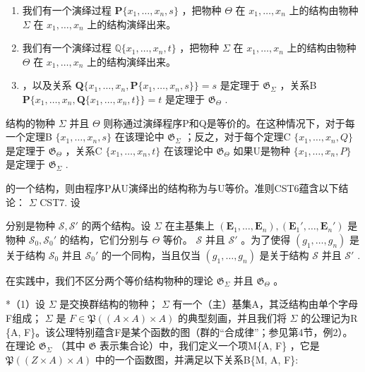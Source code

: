 \begin{enumerate}
\def\labelenumi{(\arabic{enumi})}
\item
  我们有一个演绎过程 \(\mathbf{P}\{x_1, \ldots, x_n, s\}\) ，把物种 \(\Theta\) 在 \(x_1, \ldots, x_n\) 上的结构由物种 \(\Sigma\) 在 \(x_1, \ldots, x_n\) 上的结构演绎出来。
\item
  我们有一个演绎过程 \(\mathbb{Q}\{x_1, \ldots, x_n, t\}\) ，把物种 \(\Sigma\) 在 \(x_1, \ldots, x_n\) 上的结构由物种 \(\Theta\) 在 \(x_1, \ldots, x_n\) 上的结构演绎出来。
\item
  ，以及关系 \(\mathbf{Q}\{x_1, \ldots, x_n, \mathbf{P}\{x_1, \ldots, x_n, s\}\} = s\) 是定理于 \(\mathfrak{G}_{\Sigma}\) ，关系B \(\mathbf{P}\{x_1, \ldots, x_n, \mathbf{Q}\{x_1, \ldots, x_n, t\}\} = t\) 是定理于 \(\mathfrak{G}_{\Theta}\) .
\end{enumerate}

结构的物种 \(\Sigma\) 并且 \(\Theta\) 则称通过演绎程序P和Q是等价的。在这种情况下，对于每一个定理B \(\{x_1, \ldots, x_n, s\}\) 在该理论中 \(\mathfrak{G}_{\Sigma}\) ；反之，对于每个定理C \(\{x_1, \ldots, x_n, Q\}\) 是定理于 \(\mathfrak{G}_{\Theta}\) ，关系C \(\{x_1, \ldots, x_n, t\}\) 在该理论中 \(\mathfrak{G}_{\Theta}\) 如果U是物种 \(\{x_1, \ldots, x_n, P\}\) 是定理于 \(\mathfrak{G}_{\Sigma}\) .

的一个结构，则由程序P从U演绎出的结构称为与U等价。准则CST6蕴含以下结论： \(\Sigma\) CST7. 设

分别是物种 \(\mathcal{S},\mathcal{S}'\) 的两个结构。设 \(\Sigma\) 在主基集上 \((\mathbf{E}_1,\ldots ,\mathbf{E}_n),(\mathbf{E}_1',\ldots ,\mathbf{E}_n')\) 是物种 \(\mathcal{S}_0,\mathcal{S}_0'\) 的结构，它们分别与 \(\Theta\) 等价。 \(\mathcal{S}\) 并且 \(\mathcal{S}'\) 。为了使得 \((g_1,\dots,g_n)\) 是关于结构 \(\mathcal{S}_0\) 并且 \(\mathcal{S}_0'\) 的一个同构，当且仅当 \((g_1,\dots,g_n)\) 是关于结构 \(\mathcal{S}\) 并且 \(\mathcal{S}'\) .

在实践中，我们不区分两个等价结构物种的理论 \(\mathfrak{G}_{\Sigma}\) 并且 \(\mathfrak{G}_{\Theta}\) 。


*（1）设 \(\Sigma\) 是交换群结构的物种； \(\Sigma\) 有一个（主）基集A，其泛结构由单个字母F组成； \(\Sigma\) 是 \(F \in \mathfrak{P}((A \times A) \times A)\) 的典型刻画，并且我们将 \(\Sigma\) 的公理记为R \{A, F\}。该公理特别蕴含F是某个函数的图（群的“合成律”；参见第4节，例2）。在理论 \(\mathfrak{G}_{\Sigma}\) （其中 \(\mathfrak{G}\) 表示集合论）中，我们定义一个项M\{A, F\} ，它是 \(\mathfrak{P}((Z \times A) \times A)\) 中的一个函数图，并满足以下关系B\{M, A, F\}:

